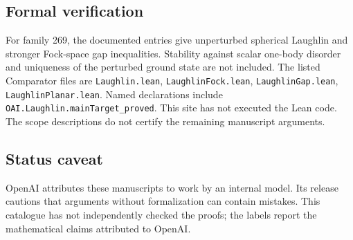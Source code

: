 \documentclass[11pt]{article}
\begin{document}
\subsection{Formal verification}
For family 269, the documented entries give unperturbed spherical Laughlin and stronger Fock-space gap inequalities. Stability against scalar one-body disorder and uniqueness of the perturbed ground state are not included. The listed Comparator files are \texttt{Laughlin.lean}, \texttt{LaughlinFock.lean}, \texttt{LaughlinGap.lean}, \texttt{LaughlinPlanar.lean}. Named declarations include \texttt{OAI.Laughlin.mainTarget\_proved}. This site has not executed the Lean code. The scope descriptions do not certify the remaining manuscript arguments.

\subsection{Status caveat}
OpenAI attributes these manuscripts to work by an internal model. Its release cautions that arguments without formalization can contain mistakes. This catalogue has not independently checked the proofs; the labels report the mathematical claims attributed to OpenAI.
\end{document}
